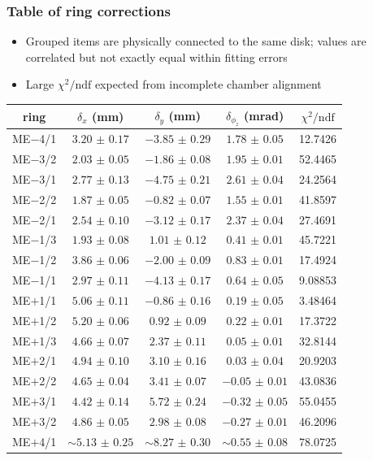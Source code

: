 \documentclass[compress]{beamer}
\begin{document}
\begin{frame}
\frametitle{Table of ring corrections}
\begin{itemize}
\item Grouped items are physically connected to the same disk; values are correlated but not exactly equal within fitting errors
\item Large $\chi^2/\mbox{ndf}$ expected from incomplete chamber alignment
\end{itemize}

\scriptsize
\renewcommand{\arraystretch}{1.1}
\begin{tabular}{c | c c c c}
ring & $\delta_x$ (mm) & $\delta_y$ (mm) & $\delta_{\phi_z}$ (mrad) & $\chi^2/\mbox{ndf}$ \\\hline
ME$-$4/1 & $ 3.20$ $\pm$ $ 0.17$ & $-3.85$ $\pm$ $ 0.29$ & $ 1.78$ $\pm$ $ 0.05$ & 12.7426 \\\hline
ME$-$3/2 & $ 2.03$ $\pm$ $ 0.05$ & $-1.86$ $\pm$ $ 0.08$ & $ 1.95$ $\pm$ $ 0.01$ & 52.4465 \\
ME$-$3/1 & $ 2.77$ $\pm$ $ 0.13$ & $-4.75$ $\pm$ $ 0.21$ & $ 2.61$ $\pm$ $ 0.04$ & 24.2564 \\
ME$-$2/2 & $ 1.87$ $\pm$ $ 0.05$ & $-0.82$ $\pm$ $ 0.07$ & $ 1.55$ $\pm$ $ 0.01$ & 41.8597 \\
ME$-$2/1 & $ 2.54$ $\pm$ $ 0.10$ & $-3.12$ $\pm$ $ 0.17$ & $ 2.37$ $\pm$ $ 0.04$ & 27.4691 \\\hline
ME$-$1/3 & $ 1.93$ $\pm$ $ 0.08$ & $ 1.01$ $\pm$ $ 0.12$ & $ 0.41$ $\pm$ $ 0.01$ & 45.7221 \\
ME$-$1/2 & $ 3.86$ $\pm$ $ 0.06$ & $-2.00$ $\pm$ $ 0.09$ & $ 0.83$ $\pm$ $ 0.01$ & 17.4924 \\
ME$-$1/1 & $ 2.97$ $\pm$ $ 0.11$ & $-4.13$ $\pm$ $ 0.17$ & $ 0.64$ $\pm$ $ 0.05$ & 9.08853 \\\hline
ME$+$1/1 & $ 5.06$ $\pm$ $ 0.11$ & $-0.86$ $\pm$ $ 0.16$ & $ 0.19$ $\pm$ $ 0.05$ & 3.48464 \\
ME$+$1/2 & $ 5.20$ $\pm$ $ 0.06$ & $ 0.92$ $\pm$ $ 0.09$ & $ 0.22$ $\pm$ $ 0.01$ & 17.3722 \\
ME$+$1/3 & $ 4.66$ $\pm$ $ 0.07$ & $ 2.37$ $\pm$ $ 0.11$ & $ 0.05$ $\pm$ $ 0.01$ & 32.8144 \\\hline
ME$+$2/1 & $ 4.94$ $\pm$ $ 0.10$ & $ 3.10$ $\pm$ $ 0.16$ & $ 0.03$ $\pm$ $ 0.04$ & 20.9203 \\
ME$+$2/2 & $ 4.65$ $\pm$ $ 0.04$ & $ 3.41$ $\pm$ $ 0.07$ & $-0.05$ $\pm$ $ 0.01$ & 43.0836 \\
ME$+$3/1 & $ 4.42$ $\pm$ $ 0.14$ & $ 5.72$ $\pm$ $ 0.24$ & $-0.32$ $\pm$ $ 0.05$ & 55.0455 \\
ME$+$3/2 & $ 4.86$ $\pm$ $ 0.05$ & $ 2.98$ $\pm$ $ 0.08$ & $-0.27$ $\pm$ $ 0.01$ & 46.2096 \\\hline
ME$+$4/1 & $\sim 5.13$ $\pm$ $ 0.25$ & $\sim 8.27$ $\pm$ $ 0.30$ & $\sim 0.55$ $\pm$ $ 0.08$ & 78.0725
\end{tabular}
\end{frame}
\end{document}
